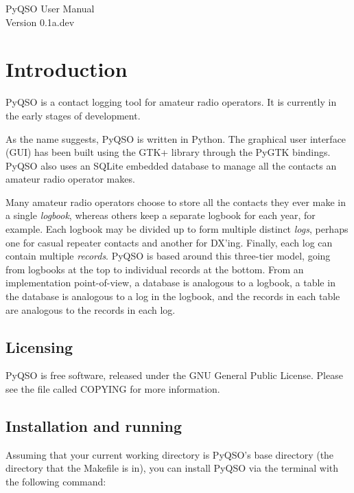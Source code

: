\documentclass[11pt, a4paper]{report}
\begin{document}
\begin{titlepage}
\begin{center}
\vspace*{5cm}
\huge{PyQSO User Manual}\\\vspace*{5cm}
\LARGE{Version 0.1a.dev}
\end{center}
\end{titlepage}

\tableofcontents

\chapter{Introduction}
PyQSO is a contact logging tool for amateur radio operators. It is currently in the early stages of development.

As the name suggests, PyQSO is written in Python. The graphical user interface (GUI) has been built using the GTK+ library through the PyGTK bindings. PyQSO also uses an SQLite embedded database to manage all the contacts an amateur radio operator makes.

Many amateur radio operators choose to store all the contacts they ever make in a single \textit{logbook}, whereas others keep a separate logbook for each year, for example. Each logbook may be divided up to form multiple distinct \textit{logs}, perhaps one for casual repeater contacts and another for DX'ing. Finally, each log can contain multiple \textit{records}. PyQSO is based around this three-tier model, going from logbooks at the top to individual records at the bottom. From an implementation point-of-view, a database is analogous to a logbook, a table in the database is analogous to a log in the logbook, and the records in each table are analogous to the records in each log.

\section{Licensing}
PyQSO is free software, released under the GNU General Public License. Please see the file called COPYING for more information.

\section{Installation and running}
Assuming that your current working directory is PyQSO's base directory (the directory that the Makefile is in), you can install PyQSO via the terminal with the following command:
\end{document}
